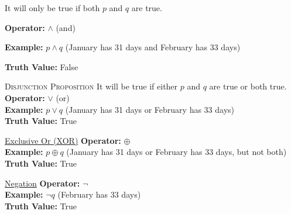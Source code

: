 \documentclass{article}
\begin{document}
\medskip
It will only be true if both $p$ and $q$ are true. 

\textbf{Operator:} $\land$ (and)  

\textbf{Example:} $p \land q$ (January has 31 days and February has 33 days)  

\textbf{Truth Value:} False

\textsc{Disjunction Proposition}
It will be true if either $p$ and $q$ are true or both true. 
\break
\textbf{Operator:} $\lor$ (or)  \\
\textbf{Example:} $p \lor q$ (January has 31 days or February has 33 days)  \\
\textbf{Truth Value:} True

\underline{Exclusive Or (XOR)}
\textbf{Operator:} $\oplus$  \\
\textbf{Example:} $p \oplus q$ (January has 31 days or February has 33 days, but not both)  \\
\textbf{Truth Value:} True

\underline{Negation}
\textbf{Operator:} $\neg$  \\
\textbf{Example:} $\neg q$ (February has 33 days)  \\
\textbf{Truth Value:} True
\end{document}
